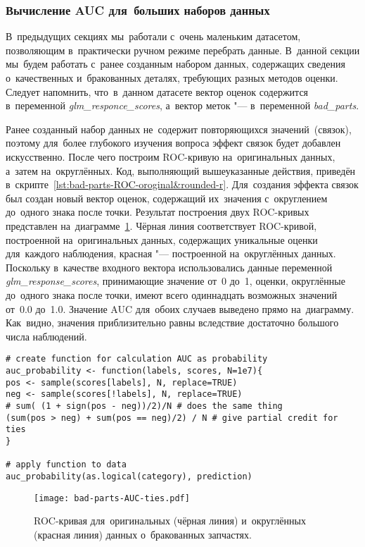 \documentclass[]{scrreprt}
\begin{document}
\subsubsection{Вычисление AUC для~больших наборов данных}
В~предыдущих секциях мы~работали с~очень маленьким датасетом, позволяющим в~практически ручном режиме перебрать данные. В~данной секции мы~будем работать с~ранее созданным набором данных, содержащих сведения о~качественных и~бракованных деталях, требующих разных методов оценки. Следует напомнить, что~в~данном датасете вектор оценок содержится в~переменной \textit{glm\_responce\_scores}, а~вектор меток "--- в~переменной \textit{bad\_parts}.

Ранее созданный набор данных не~содержит повторяющихся значений~(связок), поэтому для~более глубокого изучения вопроса эффект связок будет добавлен искусственно. После чего построим ROC-кривую на~оригинальных данных, а~затем на~округлённых. Код, выполняющий вышеуказанные действия, приведён в~скрипте~\ref{lst:bad-parts-ROC-oroginal&rounded-r}. Для~создания эффекта связок был создан новый вектор оценок, содержащий их~значения с~округлением до~одного знака после точки. Результат построения двух ROC-кривых представлен на~диаграмме~\ref{fig:bad-parts-ROC-original&rounded-r}. Чёрная линия соответствует ROC-кривой, построенной на~оригинальных данных, содержащих уникальные оценки для~каждого наблюдения, красная "--- построенной на~округлённых данных. Поскольку в~качестве входного вектора использовались данные переменной \textit{glm\_response\_scores}, принимающие значение от~0 до~1, оценки, округлённые до~одного знака после точки, имеют всего одиннадцать возможных значений от~0.0 до~1.0. Значение AUC для~обоих случаев выведено прямо на~диаграмму. Как~видно, значения приблизительно равны вследствие достаточно большого числа наблюдений.
%
\begin{lstlisting}[float, caption = Построение ROC-кривой на~оригинальных (чёрная линия) и~округлённых (красная линия) данных о~бракованных запчастях, firstnumber=1, label= lst:bad-parts-ROC-oroginal&rounded-r]
# create function for calculation AUC as probability
auc_probability <- function(labels, scores, N=1e7){
pos <- sample(scores[labels], N, replace=TRUE)
neg <- sample(scores[!labels], N, replace=TRUE)
# sum( (1 + sign(pos - neg))/2)/N # does the same thing
(sum(pos > neg) + sum(pos == neg)/2) / N # give partial credit for ties
}

# apply function to data
auc_probability(as.logical(category), prediction)
\end{lstlisting}
%
\begin{figure}[ht]
	\centering
	\texttt{[image: bad-parts-AUC-ties.pdf]}
	\caption{ROC-кривая для~оригинальных (чёрная линия) и~округлённых (красная линия) данных о~бракованных запчастях.}
	\label{fig:bad-parts-ROC-original&rounded-r}
\end{figure}
%
\end{document}
